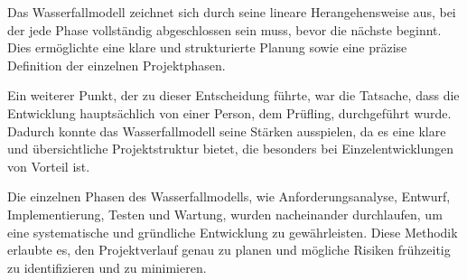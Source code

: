 Das Wasserfallmodell zeichnet sich durch seine lineare Herangehensweise aus, bei der jede Phase vollständig abgeschlossen sein muss, bevor die nächste beginnt. Dies ermöglichte eine klare und strukturierte Planung sowie eine präzise Definition der einzelnen Projektphasen.

Ein weiterer Punkt, der zu dieser Entscheidung führte, war die Tatsache, dass die Entwicklung hauptsächlich von einer Person, dem Prüfling, durchgeführt wurde. Dadurch konnte das Wasserfallmodell seine Stärken ausspielen, da es eine klare und übersichtliche Projektstruktur bietet, die besonders bei Einzelentwicklungen von Vorteil ist.

Die einzelnen Phasen des Wasserfallmodells, wie Anforderungsanalyse, Entwurf, Implementierung, Testen und Wartung, wurden nacheinander durchlaufen, um eine systematische und gründliche Entwicklung zu gewährleisten. Diese Methodik erlaubte es, den Projektverlauf genau zu planen und mögliche Risiken frühzeitig zu identifizieren und zu minimieren.
